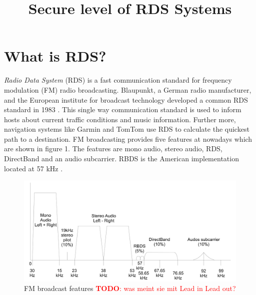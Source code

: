 \documentclass[conference,11pt,a4paper]{IEEEtran}
\newcommand{\todo}[1]{\textcolor{red}{\textbf{TODO}: #1}}
\begin{document}
	
		\title{Secure level of RDS Systems}
		\author{
		}
		\maketitle
		\thispagestyle{plain}
		\pagestyle{plain}

	
	\section{What is RDS?}
		\textit{Radio Data System} (RDS) is a fast communication standard for frequency modulation (FM) radio broadcasting. Blaupunkt, a German radio manufacturer, and the European institute for broadcast technology developed a common RDS standard in 1983 \cite{Grds}. This single way communication standard is used to inform hosts about current traffic conditions and music information. Further more, navigation systems like Garmin and TomTom use RDS to calculate the quickest path to a destination. FM broadcasting provides five features at nowadays which are shown in figure 1. The features are mono audio, stereo audio, RDS, DirectBand and an audio subcarrier. RBDS is the American implementation located at 57 kHz \cite{standard}.
		
		\begin{figure}[h]
			\centering
			\includegraphics[scale=0.13]{img/RDS_spectrum2}
			\caption{FM broadcast features \todo{was meint sie mit Lead in Lead out? }  }
			\label{fig: spec}
		\end{figure}
	
\end{document}

